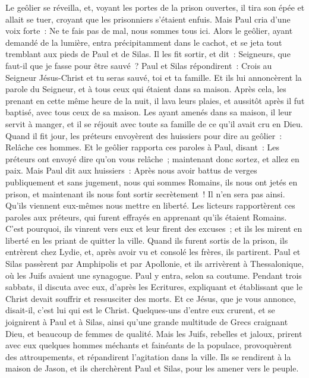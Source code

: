 \begin{multicols}{2}
Le geôlier se réveilla, et, voyant les portes de la prison ouvertes, il tira son épée et allait se tuer, croyant que les prisonniers s'étaient enfuis.
Mais Paul cria d'une voix forte~: Ne te fais pas de mal, nous sommes tous ici.
Alors le geôlier, ayant demandé de la lumière, entra précipitamment dans le cachot, et se jeta tout tremblant aux pieds de Paul et de Silas.
Il les fit sortir, et dit~: Seigneurs, que faut-il que je fasse pour être sauvé~?
Paul et Silas répondirent~: Crois au Seigneur Jésus-Christ et tu seras sauvé, toi et ta famille.
Et ils lui annoncèrent la parole du Seigneur, et à tous ceux qui étaient dans sa maison.
Après cela, les prenant en cette même heure de la nuit, il lava leurs plaies, et aussitôt après il fut baptisé, avec tous ceux de sa maison.
Les ayant amenés dans sa maison, il leur servit à manger, et il se réjouit avec toute sa famille de ce qu'il avait cru en Dieu.
Quand il fit jour, les préteurs envoyèrent des huissiers pour dire au geôlier~: Relâche ces hommes.
Et le geôlier rapporta ces paroles à Paul, disant~: Les préteurs ont envoyé dire qu'on vous relâche~; maintenant donc sortez, et allez en paix.
Mais Paul dit aux huissiers~: Après nous avoir battus de verges publiquement et sans jugement, nous qui sommes Romains, ils nous ont jetés en prison, et maintenant ils nous font sortir secrètement~! Il n'en sera pas ainsi. Qu'ils viennent eux-mêmes nous mettre en liberté.
Les licteurs rapportèrent ces paroles aux préteurs, qui furent effrayés en apprenant qu'ils étaient Romains.
C'est pourquoi, ils vinrent vers eux et leur firent des excuses~; et ils les mirent en liberté en les priant de quitter la ville.
Quand ils furent sortis de la prison, ils entrèrent chez Lydie, et, après avoir vu et consolé les frères, ils partirent.
\VerseOne{}Paul et Silas passèrent par Amphipolis et par Apollonie, et ils arrivèrent à Thessalonique, où les Juifs avaient une synagogue.
Paul y entra, selon sa coutume. Pendant trois sabbats, il discuta avec eux, d'après les Ecritures,
expliquant et établissant que le Christ devait souffrir et ressusciter des morts. Et ce Jésus, que je vous annonce, disait-il, c'est lui qui est le Christ.
Quelques-uns d'entre eux crurent, et se joignirent à Paul et à Silas, ainsi qu'une grande multitude de Grecs craignant Dieu, et beaucoup de femmes de qualité.
Mais les Juifs, rebelles et jaloux, prirent avec eux quelques hommes méchants et fainéants de la populace, provoquèrent des attroupements, et répandirent l'agitation dans la ville. Ils se rendirent à la maison de Jason, et ils cherchèrent Paul et Silas, pour les amener vers le peuple.

\end{multicols}
